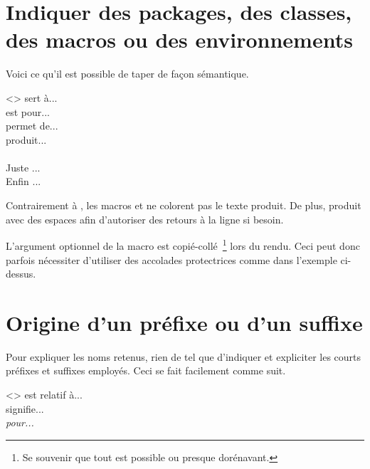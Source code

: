\section{Indiquer des packages, des classes, des macros ou des environnements}

Voici ce qu'il est possible de taper de façon sémantique.


\begin{tdoclatex}<>
 sert à...           \\
 est pour...      \\
 permet de...      \\
 produit...               \\
          \\
Juste ...                \\
Enfin ...
\end{tdoclatex}


\begin{tdocrem}
    Contrairement à , les macros  et  ne colorent pas le texte produit.
    De plus,  produit  avec des espaces afin d'autoriser des retours à la ligne si besoin.
\end{tdocrem}


\begin{tdocwarn}
    L'argument optionnel de la macro  est copié-collé\,%
    \footnote{
        Se souvenir que tout est possible ou presque dorénavant.
    }
    lors du rendu. Ceci peut donc parfois nécessiter d'utiliser des accolades protectrices comme dans l'exemple ci-dessus.
\end{tdocwarn}



\section{Origine d'un préfixe ou d'un suffixe}

Pour expliquer les noms retenus, rien de tel que d'indiquer et expliciter les courts préfixes et suffixes employés. Ceci se fait facilement comme suit.


\begin{tdoclatex}<>
 est relatif à...    \\
 signifie... \\
\emph{ pour...}
\end{tdoclatex}


